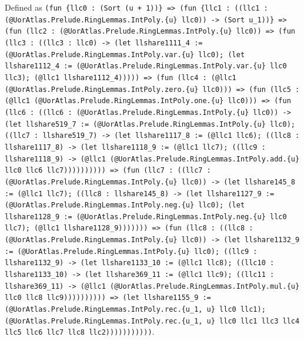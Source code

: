 \documentclass[11pt]{article}
\begin{document}
\noindent Defined as \texttt{(fun \{llc0 : (Sort (u + 1))\} => (fun \{llc1 : ((llc1 : (@UorAtlas.Prelude.RingLemmas.IntPoly.\{u\} llc0)) -> (Sort u\_1))\} => (fun (llc2 : (@UorAtlas.Prelude.RingLemmas.IntPoly.\{u\} llc0)) => (fun (llc3 : ((llc3 : llc0) -> (let llshare1111\_4 := (@UorAtlas.Prelude.RingLemmas.IntPoly.var.\{u\} llc0); (let llshare1112\_4 := (@UorAtlas.Prelude.RingLemmas.IntPoly.var.\{u\} llc0 llc3); (@llc1 llshare1112\_4))))) => (fun (llc4 : (@llc1 (@UorAtlas.Prelude.RingLemmas.IntPoly.zero.\{u\} llc0))) => (fun (llc5 : (@llc1 (@UorAtlas.Prelude.RingLemmas.IntPoly.one.\{u\} llc0))) => (fun (llc6 : ((llc6 : (@UorAtlas.Prelude.RingLemmas.IntPoly.\{u\} llc0)) -> (let llshare519\_7 := (@UorAtlas.Prelude.RingLemmas.IntPoly.\{u\} llc0); ((llc7 : llshare519\_7) -> (let llshare1117\_8 := (@llc1 llc6); ((llc8 : llshare1117\_8) -> (let llshare1118\_9 := (@llc1 llc7); ((llc9 : llshare1118\_9) -> (@llc1 (@UorAtlas.Prelude.RingLemmas.IntPoly.add.\{u\} llc0 llc6 llc7)))))))))) => (fun (llc7 : ((llc7 : (@UorAtlas.Prelude.RingLemmas.IntPoly.\{u\} llc0)) -> (let llshare145\_8 := (@llc1 llc7); ((llc8 : llshare145\_8) -> (let llshare1127\_9 := (@UorAtlas.Prelude.RingLemmas.IntPoly.neg.\{u\} llc0); (let llshare1128\_9 := (@UorAtlas.Prelude.RingLemmas.IntPoly.neg.\{u\} llc0 llc7); (@llc1 llshare1128\_9))))))) => (fun (llc8 : ((llc8 : (@UorAtlas.Prelude.RingLemmas.IntPoly.\{u\} llc0)) -> (let llshare1132\_9 := (@UorAtlas.Prelude.RingLemmas.IntPoly.\{u\} llc0); ((llc9 : llshare1132\_9) -> (let llshare1133\_10 := (@llc1 llc8); ((llc10 : llshare1133\_10) -> (let llshare369\_11 := (@llc1 llc9); ((llc11 : llshare369\_11) -> (@llc1 (@UorAtlas.Prelude.RingLemmas.IntPoly.mul.\{u\} llc0 llc8 llc9)))))))))) => (let llshare1155\_9 := (@UorAtlas.Prelude.RingLemmas.IntPoly.rec.\{u\_1, u\} llc0 llc1); (@UorAtlas.Prelude.RingLemmas.IntPoly.rec.\{u\_1, u\} llc0 llc1 llc3 llc4 llc5 llc6 llc7 llc8 llc2)))))))))))}.\par
\end{document}
